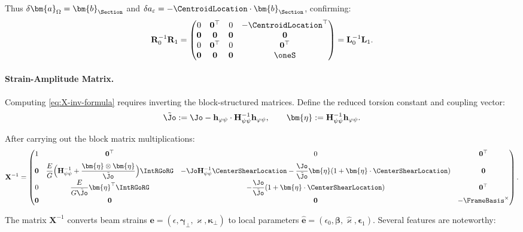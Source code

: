 Thus $\delta\bm{a}_\Omega = \bm{b}_{\Section}$ and 
$\delta a_\varepsilon = -\CentroidLocation\cdot \bm{b}_{\Section}$, confirming:
\begin{equation*}
\mathbf{R}_0^{-1}\mathbf{R}_1 = \begin{pmatrix}
0 & \mathbf{0}^\top & 0 & -\CentroidLocation^\top \\
\mathbf{0} & \mathbf{0} & \mathbf{0} & \mathbf{0} \\
0 & \mathbf{0}^\top & 0 & \mathbf{0}^\top \\
\mathbf{0} & \mathbf{0} & \mathbf{0} & \oneS
\end{pmatrix} = \mathbf{L}_0^{-1}\mathbf{L}_1.
\end{equation*}

\paragraph{Strain-Amplitude Matrix.}

Computing \eqref{eq:X-inv-formula} requires inverting the block-structured 
matrices. Define the reduced torsion constant and coupling vector:
\begin{equation}
\tilde{\Jo} := \Jo - \mathbf{h}_{\varphi\psi}\cdot \mathbf{H}_{\psi\psi}^{-1} \mathbf{h}_{\varphi\psi}, 
\qquad 
\bm{\eta} := \mathbf{H}_{\psi\psi}^{-1} \mathbf{h}_{\varphi\psi}.
\label{eq:reduced-torsion}
\end{equation}

After carrying out the block matrix multiplications:
\begin{equation}
\mathbf{X}^{-1} = \begin{pmatrix}
1 & \mathbf{0}^\top & 0 & \mathbf{0}^\top \\[6pt]
\mathbf{0} & \displaystyle\frac{E}{G}\Big(\mathbf{H}_{\psi\psi}^{-1} 
+ \frac{\bm{\eta}\otimes\bm{\eta}}{\tilde{\Jo}}\Big)\IntRGoRG 
& -\Jo\mathbf{H}_{\psi\psi}^{-1}\CenterShearLocation 
- \displaystyle\frac{\Jo}{\tilde{\Jo}}\bm{\eta}(1 + \bm{\eta}\cdot\CenterShearLocation) 
& \mathbf{0} \\[6pt]
0 & \displaystyle\frac{E}{G\tilde{\Jo}}\bm{\eta}^\top\IntRGoRG 
& -\displaystyle\frac{\Jo}{\tilde{\Jo}}(1 + \bm{\eta}\cdot\CenterShearLocation) 
& \mathbf{0}^\top \\[6pt]
\mathbf{0} & \mathbf{0} & \mathbf{0} & -\FrameBasis^\times
\end{pmatrix}.
\label{eq:X-inv-explicit}
\end{equation}

The matrix $\mathbf{X}^{-1}$ converts beam strains 
$\bm{e} = (\epsilon, \bm{\gamma}_\perp, \varkappa, \bm{\kappa}_\perp)$ 
to local parameters $\hat{\bm{e}} = (\epsilon_0, \bm{\beta}, \hat{\varkappa}, \bm{\epsilon}_1)$. 
Several features are noteworthy:

